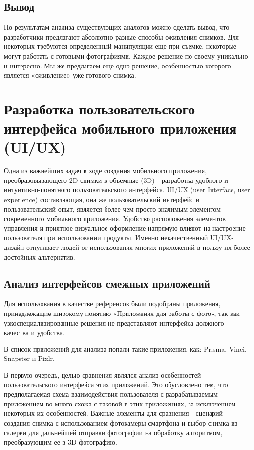 \subsection{Вывод}
По результатам анализа существующих аналогов можно сделать вывод, что разработчики предлагают абсолютно разные способы оживления снимков. Для некоторых требуются определенный манипуляции еще при съемке, некоторые могут работать с готовыми фотографиями. Каждое решение по-своему уникально и интересно. Мы же предлагаем еще одно решение, особенностью которого является «оживление» уже готового снимка.


\section{Разработка пользовательского интерфейса мобильного приложения (UI/UX)}

Одна из важнейших задач в ходе создания мобильного приложения, преобразовывающего 2D снимки в объемные (3D) - разработка удобного и интуитивно-понятного пользовательского интерфейса. UI/UX (user Interface, user experience) составляющая, она же пользовательский интерфейс и пользовательский опыт, является более чем просто значимым элементом современного мобильного приложения. Удобство расположения элементов управления и приятное визуальное оформление напрямую влияют на настроение пользователя при использовании продукты. Именно некачественный UI/UX-дизайн отпугивает людей от использования многих приложений в пользу их более достойных альтернатив.

\subsection{Анализ интерфейсов смежных приложений}

Для использования в качестве референсов были подобраны приложения, принадлежащие широкому понятию «Приложения для работы с фото», так как узкоспециализированные решения не представляют интерфейса должного качества и удобства.

В список приложений для анализа попали такие приложения, как:  Prisma, Vinci, Snapster и Pixlr.

В первую очередь, целью сравнения являлся анализ особенностей пользовательского интерфейса этих приложений. Это обусловлено тем, что предполагаемая схема  взаимодействия пользователя с разрабатываемым приложением во много схожа с таковой в этих приложениях, за исключением некоторых их особенностей. Важные элементы для сравнения  - сценарий создания снимка с использованием фотокамеры смартфона и выбор снимка из галереи для дальнейшей отправки фотографии на обработку алгоритмом, преобразующим ее в 3D фотографию.

